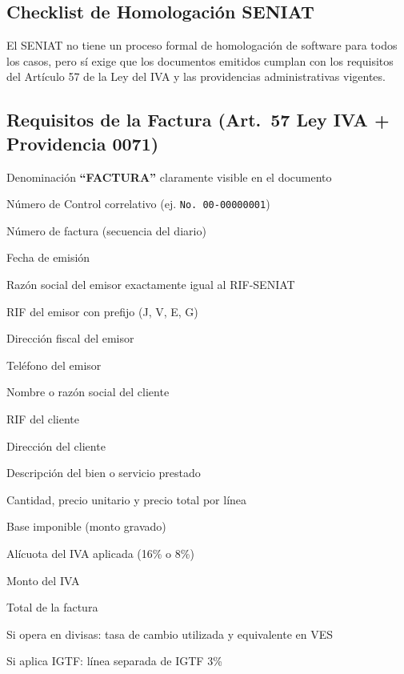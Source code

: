 \documentclass[11pt,a4paper]{article}
\begin{document}
\begin{Form}
\section{Checklist de Homologación SENIAT}

El SENIAT no tiene un proceso formal de homologación de software para todos los casos, pero sí exige que los documentos emitidos cumplan con los requisitos del Artículo 57 de la Ley del IVA y las providencias administrativas vigentes.

\subsection{Requisitos de la Factura (Art.\ 57 Ley IVA + Providencia 0071)}

\begin{checklist}
  \item Denominación \textbf{``FACTURA''} claramente visible en el documento
  \item Número de Control correlativo (ej. \texttt{No. 00-00000001})
  \item Número de factura (secuencia del diario)
  \item Fecha de emisión
  \item Razón social del emisor exactamente igual al RIF-SENIAT
  \item RIF del emisor con prefijo (J, V, E, G)
  \item Dirección fiscal del emisor
  \item Teléfono del emisor
  \item Nombre o razón social del cliente
  \item RIF del cliente
  \item Dirección del cliente
  \item Descripción del bien o servicio prestado
  \item Cantidad, precio unitario y precio total por línea
  \item Base imponible (monto gravado)
  \item Alícuota del IVA aplicada (16\% o 8\%)
  \item Monto del IVA
  \item Total de la factura
  \item Si opera en divisas: tasa de cambio utilizada y equivalente en VES
  \item Si aplica IGTF: línea separada de IGTF 3\%
\end{checklist}


\end{Form}
\end{document}
